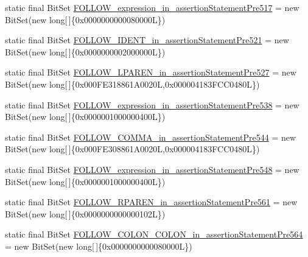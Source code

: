 \begin{DoxyCompactItemize}
\item 
static final Bit\-Set \hyperlink{classorg_1_1tzi_1_1use_1_1parser_1_1testsuite_1_1_test_suite_parser_a391d8728951e4c7e059ae5094a39b734}{F\-O\-L\-L\-O\-W\-\_\-expression\-\_\-in\-\_\-assertion\-Statement\-Pre517} = new Bit\-Set(new long\mbox{[}$\,$\mbox{]}\{0x0000000000080000\-L\})
\item 
static final Bit\-Set \hyperlink{classorg_1_1tzi_1_1use_1_1parser_1_1testsuite_1_1_test_suite_parser_a2a8521a4704447e6cc3360fae85532e7}{F\-O\-L\-L\-O\-W\-\_\-\-I\-D\-E\-N\-T\-\_\-in\-\_\-assertion\-Statement\-Pre521} = new Bit\-Set(new long\mbox{[}$\,$\mbox{]}\{0x0000000002000000\-L\})
\item 
static final Bit\-Set \hyperlink{classorg_1_1tzi_1_1use_1_1parser_1_1testsuite_1_1_test_suite_parser_a7a8c68a9736fac4fb7e180eb144ed456}{F\-O\-L\-L\-O\-W\-\_\-\-L\-P\-A\-R\-E\-N\-\_\-in\-\_\-assertion\-Statement\-Pre527} = new Bit\-Set(new long\mbox{[}$\,$\mbox{]}\{0x000\-F\-E318861\-A0020\-L,0x000004183\-F\-C\-C0480\-L\})
\item 
static final Bit\-Set \hyperlink{classorg_1_1tzi_1_1use_1_1parser_1_1testsuite_1_1_test_suite_parser_af8209fe4a6e87d9151ed6150a68be5e7}{F\-O\-L\-L\-O\-W\-\_\-expression\-\_\-in\-\_\-assertion\-Statement\-Pre538} = new Bit\-Set(new long\mbox{[}$\,$\mbox{]}\{0x0000001000000400\-L\})
\item 
static final Bit\-Set \hyperlink{classorg_1_1tzi_1_1use_1_1parser_1_1testsuite_1_1_test_suite_parser_af3cc1d7ad042c5438011a0a92c762434}{F\-O\-L\-L\-O\-W\-\_\-\-C\-O\-M\-M\-A\-\_\-in\-\_\-assertion\-Statement\-Pre544} = new Bit\-Set(new long\mbox{[}$\,$\mbox{]}\{0x000\-F\-E308861\-A0020\-L,0x000004183\-F\-C\-C0480\-L\})
\item 
static final Bit\-Set \hyperlink{classorg_1_1tzi_1_1use_1_1parser_1_1testsuite_1_1_test_suite_parser_afa04d8c7c67c4d37a0752a70ed33c3ba}{F\-O\-L\-L\-O\-W\-\_\-expression\-\_\-in\-\_\-assertion\-Statement\-Pre548} = new Bit\-Set(new long\mbox{[}$\,$\mbox{]}\{0x0000001000000400\-L\})
\item 
static final Bit\-Set \hyperlink{classorg_1_1tzi_1_1use_1_1parser_1_1testsuite_1_1_test_suite_parser_a69c8f7cbfff0fd2eb2ac54974de2d59e}{F\-O\-L\-L\-O\-W\-\_\-\-R\-P\-A\-R\-E\-N\-\_\-in\-\_\-assertion\-Statement\-Pre561} = new Bit\-Set(new long\mbox{[}$\,$\mbox{]}\{0x0000000000000102\-L\})
\item 
static final Bit\-Set \hyperlink{classorg_1_1tzi_1_1use_1_1parser_1_1testsuite_1_1_test_suite_parser_a22433076c3574bd2700cf193f1e51876}{F\-O\-L\-L\-O\-W\-\_\-\-C\-O\-L\-O\-N\-\_\-\-C\-O\-L\-O\-N\-\_\-in\-\_\-assertion\-Statement\-Pre564} = new Bit\-Set(new long\mbox{[}$\,$\mbox{]}\{0x0000000000080000\-L\})

\end{DoxyCompactItemize}
